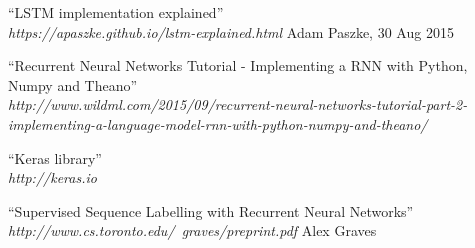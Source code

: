 \documentclass[twoside]{article}
\begin{document}
\begin{multicols}{2}
\begin{thebibliography}{99}
    ``LSTM implementation explained'' \\
\emph{https://apaszke.github.io/lstm-explained.html} 
	Adam Paszke, 30 Aug 2015

    ``Recurrent Neural Networks Tutorial - Implementing a RNN with Python, Numpy and Theano'' \\ \emph{http://www.wildml.com/2015/09/recurrent-neural-networks-tutorial-part-2-implementing-a-language-model-rnn-with-python-numpy-and-theano/}

    ``Keras library'' \\
\emph{http://keras.io}

    ``Supervised Sequence Labelling with Recurrent Neural Networks''	\\	\emph{http://www.cs.toronto.edu/~graves/preprint.pdf} 
    Alex Graves

\end{thebibliography}


\end{multicols}
\end{document}
